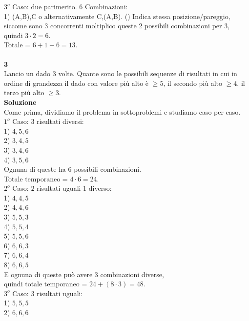 \documentclass[11pt]{article}
\begin{document}
            $3^o$ Caso: due parimerito. $6$ Combinazioni:\\
            1) (A,B),C o alternativamente C,(A,B). () Indica stessa posizione/pareggio, siccome sono $3$ concorrenti moltiplico queste $2$ possibili combinazioni per $3$, quindi $3 \cdot 2 = 6$.\\
            Totale = $6 + 1 + 6 = 13$.\\
            \\
            \textbf{\large 3}\\
            Lancio un dado $3$ volte. Quante sono le possibili sequenze di risultati in cui in ordine di grandezza il dado con valore più alto è $\geq 5$, il secondo più alto $\geq 4$, il terzo più alto $\geq 3$.\\
            \textbf{\large Soluzione}\\
            Come prima, dividiamo il problema in sottoproblemi e studiamo caso per caso.\\
            $1^o$ Caso: $3$ risultati diversi:\\
            1) $4, 5, 6$\\
            2) $3, 4, 5$\\
            3) $3, 4, 6$\\
            4) $3, 5, 6$\\
            Ognuna di queste ha 6 possibili combinazioni.\\
            Totale temporaneo = $4 \cdot 6 = 24$.\\
            $2^o$ Caso: $2$ risultati uguali $1$ diverso:\\
            1) $4,4,5$\\
            2) $4,4,6$\\
            3) $5,5,3$\\
            4) $5,5,4$\\
            5) $5,5,6$\\
            6) $6,6,3$\\
            7) $6,6,4$\\
            8) $6,6,5$\\
            E ognuna di queste può avere $3$ combinazioni diverse, \\quindi totale temporaneo = $24 + (8 \cdot 3) = 48$.\\
            $3^o$ Caso: $3$ risultati uguali:\\
            1) $5,5,5$\\
            2) $6,6,6$\\
\end{document}

